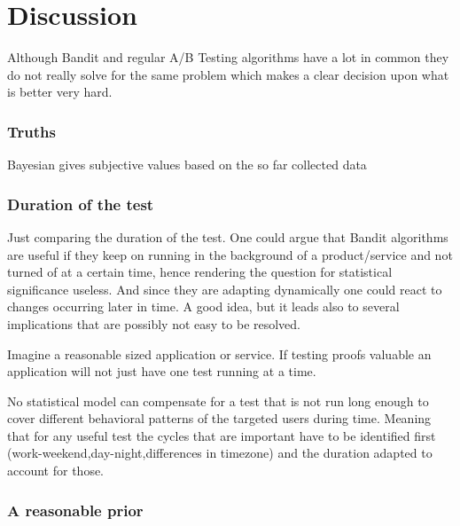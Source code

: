 \documentclass[main.tex]{subfiles}
\begin{document}
\chapter{Discussion}
Although Bandit and regular A/B Testing algorithms have a lot in common they do not really solve for the same problem which makes a clear decision upon what is better very hard.
\subsection{Truths}
Bayesian gives subjective values based on the so far collected data

\subsection{Duration of the test}
Just comparing the duration of the test. One could argue that Bandit algorithms are useful if they keep on running in the background of a product/service and not turned of at a certain time, hence rendering the question for statistical significance useless. And since they are adapting dynamically one could react to changes occurring later in time. A good idea, but it leads also to several implications that are possibly not easy to be resolved. 

Imagine a reasonable sized application or service. If testing proofs valuable an application will not just have one test running at a time. 

No statistical model can compensate for a test that is not run long enough to cover different behavioral patterns of the targeted users during time. Meaning that for any useful test the cycles that are important have to be identified first (work-weekend,day-night,differences in timezone) and the duration adapted to account for those.

\subsection{A reasonable prior}
\end{document}
